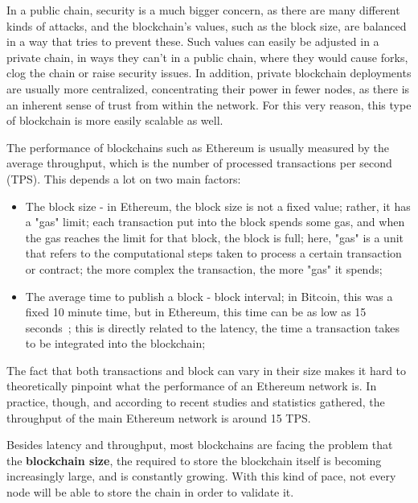 In a public chain, security is a much bigger concern, as there are many different kinds of attacks, and the blockchain's values, such as the block size, are balanced in a way that tries to prevent these. Such values can easily be adjusted in a private chain, in ways they can't in a public chain, where they would cause forks, clog the chain or raise security issues. In addition, private blockchain deployments are usually more centralized, concentrating their power in fewer nodes, as there is an inherent sense of trust from within the network. For this very reason, this type of blockchain is more easily scalable as well.



The performance of blockchains such as Ethereum is usually measured by the average throughput, which is the number of processed transactions per second (TPS). This depends a lot on two main factors:
\begin{itemize}
\item The block size - in Ethereum, the block size is not a fixed value; rather, it has a "gas" limit; each transaction put into the block spends some gas, and when the gas reaches the limit for that block, the block is full; here, "gas" is a unit that refers to the computational steps taken to process a certain transaction or contract; the more complex the transaction, the more "gas" it spends;
\item The average time to publish a block - block interval; in Bitcoin, this was a fixed 10 minute time, but in Ethereum, this time can be as low as 15 seconds~\cite{Scherer2017}; this is directly related to the latency, the time a transaction takes to be integrated into the blockchain;
\end{itemize}

The fact that both transactions and block can vary in their size makes it hard to theoretically pinpoint what the performance of an Ethereum network is. In practice, though, and according to recent studies and statistics gathered, the throughput of the main Ethereum network is around 15 TPS. %

Besides latency and throughput, most blockchains are facing the problem that the \textbf{blockchain size}, the required to store the blockchain itself is becoming increasingly large, and is constantly growing. With this kind of pace, not every node will be able to store the chain in order to validate it.

